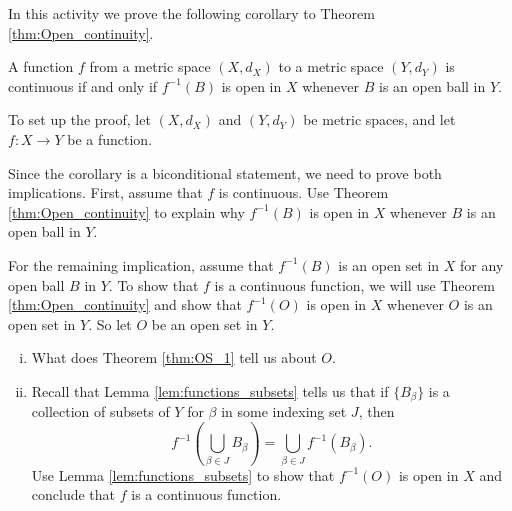 \begin{activity} \label{act:continuity_balls} In this activity we prove the following corollary to Theorem \ref{thm:Open_continuity}.

\begin{corollary} \label{cor:continuity_balls} A function $f$ from a metric space $(X,d_X)$ to a metric space $(Y,d_Y)$ is continuous if and only if $f^{-1}(B)$ is open in $X$ whenever $B$ is an open ball in $Y$.
\end{corollary}

To set up the proof, let $(X,d_X)$ and $(Y,d_Y)$ be metric spaces, and let $f: X \to Y$ be a function.

	\ba

	\item Since the corollary is a biconditional statement, we need to prove both implications. First, assume that $f$ is continuous. Use Theorem \ref{thm:Open_continuity} to explain why $f^{-1}(B)$ is open in $X$ whenever $B$ is an open ball in $Y$. 

\item For the remaining implication, assume that $f^{-1}(B)$ is an open set in $X$ for any open ball $B$ in $Y$. To show that $f$ is a continuous function, we will use Theorem \ref{thm:Open_continuity} and show that $f^{-1}(O)$ is open in $X$ whenever $O$ is an open set in $Y$. So let $O$ be an open set in $Y$. 
	\begin{enumerate}[i.]
	\item What does Theorem \ref{thm:OS_1} tell us about $O$. 
	
	\item Recall that Lemma \ref{lem:functions_subsets} tells us that if $\{B_{\beta}\}$ is a collection of subsets of $Y$ for $\beta$ in some indexing set $J$, then \[f^{-1}\left(\bigcup_{\beta \in J} B_{\beta}\right) = \bigcup_{\beta \in J} f^{-1}(B_{\beta}).\]
 Use Lemma \ref{lem:functions_subsets} to show that $f^{-1}(O)$ is open in $X$ and conclude that $f$ is a continuous function. 
 
 	\end{enumerate}

	\ea
	
\end{activity}

